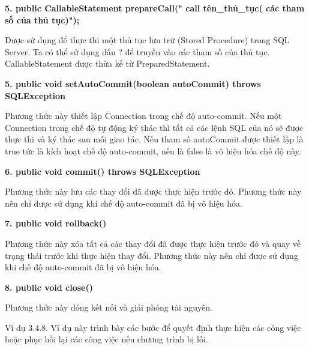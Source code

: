 \textbf{5. public CallableStatement prepareCall("{ call tên\_thủ\_tục( các tham số của thủ tục)}");}

Được sử dụng để thực thi một thủ tục lưu trữ (Stored Procedure) trong SQL Server. Ta có thể sử dụng dấu ? để truyền vào các tham số của thủ tục. CallableStatement được thừa kế từ PreparedStatement.
  
\textbf{5. public void setAutoCommit(boolean autoCommit) throws SQLException
}

Phương thức này thiết lập Connection trong chế độ auto-commit. Nếu một Connection trong chế độ tự động ký thác thì tất cả các lệnh SQL của nó sẽ được thực thi và ký thác sau mỗi giao tác. Nếu tham số autoCommit được thiết lập là true tức là kích hoạt chế độ auto-commit, nếu là false là vô hiệu hóa chế độ này.

\textbf{6. public void commit() throws SQLException}

Phương thức này lưu các thay đổi đã được thực hiện trước đó. Phương thức này nên chỉ được sử dụng khi chế độ auto-commit đã bị vô hiệu hóa.

\textbf{7. public void rollback()}

Phương thức này xóa tất cả các thay đổi đã được thực hiện trước đó và quay về trạng thái trước khi thực hiện thay đổi. Phương thức này nên chỉ được sử dụng khi chế độ auto-commit đã bị vô hiệu hóa.

\textbf{8. public void close()}

Phương thức này đóng kết nối và giải phóng tài nguyên.

Ví dụ 3.4.8. Ví dụ này trình bày các bước để quyết định thực hiện các công việc hoặc phục hồi lại các công việc nếu chương trình bị lỗi.

